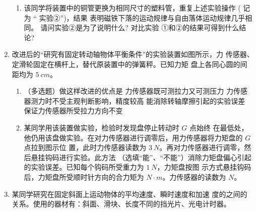 \begin{enumerate}
\begin{enumerate}
\item 
该同学将装置中的铜管更换为相同尺寸的塑料管，重复上述实验操作 ( 记为 “ 实验②”)，结果
表明磁铁下落的运动规律与自由落体运动规律几乎相同。 请问实验②是为了说明什么? 对比实验
①和②的结果可得到什么结论?


\end{enumerate}



\newpage
\item
{}
改进后的“研究有固定转动轴物体平衡条件”的实验装置如图所示，力
传感器、定滑轮固定在横杆上，替代原装置中的弹簧秤。已知力矩
盘上各同心圆的间距均为 $ 5 \ cm $。
\begin{figure}[h!]
\centering

\end{figure}

\begin{enumerate}
\renewcommand{\labelenumi}{\arabic{enumi}.}
\item
（多选题）做这样改进的优点是  
\fourchoices
{力传感器既可测拉力又可测压力}
{力传感器测力时不受主观判断影响，精度较高}
{能消除转轴摩擦引起的实验误差}
{保证力传感器所受拉力方向不变}



\item 
某同学用该装置做实验，检验时发现盘停止转动时 $ G $ 点始终
在最低处，他仍用该盘做实验。在对力传感器进行调零后，用力传感器将力矩盘的 $ G $ 点拉到图示位
置，此时力传感器读数为 $ 3 \ N $。再对力传感器进行调零，然后悬挂钩码进行实验。此方法
（选填“能”、“不能”）消除力矩盘偏心引起的实验误差。已知每个钩码所受重力为 $ 1 \ N $，力矩盘按图
示方式悬挂钩码后，力矩盘所受顺时针方向的合力矩为  $ N \cdot m $。力传感器的读数为  $ N $。

\end{enumerate}







\newpage
\item
{}
某同学研究在固定斜面上运动物体的平均速度、瞬时速度和加速
度的之间的关系。使用的器材有：斜面、滑块、长度不同的挡光片、光电计时器。
\begin{figure}[h!]
\centering

\end{figure}



\end{enumerate}
